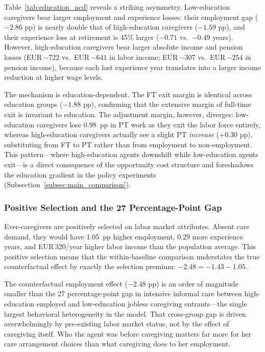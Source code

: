 Table~\ref{tab:education_ncd} reveals a striking asymmetry. Low-education caregivers bear larger employment and experience losses: their employment gap ($-2.86$ pp) is nearly double that of high-education caregivers ($-1.59$ pp), and their experience loss at retirement is 45\% larger ($-0.71$ vs.\ $-0.49$ years). However, high-education caregivers bear larger absolute income and pension losses (EUR\,$-722$ vs.\ EUR\,$-641$ in labor income; EUR\,$-307$ vs.\ EUR\,$-254$ in pension income), because each lost experience year translates into a larger income reduction at higher wage levels.

The mechanism is education-dependent. The FT exit margin is identical across education groups ($-1.88$ pp), confirming that the extensive margin of full-time exit is invariant to education. The adjustment margin, however, diverges: low-education caregivers lose 0.98~pp in PT work as they exit the labor force entirely, whereas high-education caregivers actually see a slight PT \textit{increase} ($+0.30$ pp), substituting from FT to PT rather than from employment to non-employment. This pattern---where high-education agents downshift while low-education agents exit---is a direct consequence of the opportunity cost structure and foreshadows the education gradient in the policy experiments (Subsection~\ref{subsec:main_comparison}).

\subsubsection{Positive Selection and the 27 Percentage-Point Gap}

Ever-caregivers are positively selected on labor market attributes. Absent care demand, they would have 1.05~pp higher employment, 0.29 more experience years, and EUR\,320/year higher labor income than the population average. This positive selection means that the within-baseline comparison understates the true counterfactual effect by exactly the selection premium: $-2.48 = -1.43 - 1.05$.

The counterfactual employment effect ($-2.48$ pp) is an order of magnitude smaller than the 27 percentage-point gap in intensive informal care between high-education employed and low-education jobless caregiving entrants---the single largest behavioral heterogeneity in the model. That cross-group gap is driven overwhelmingly by pre-existing labor market status, not by the effect of caregiving itself. Who the agent was before caregiving matters far more for her care arrangement choices than what caregiving does to her employment.

